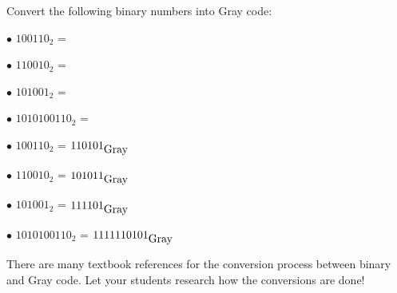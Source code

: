 

Convert the following binary numbers into Gray code:

\medskip
\item{$\bullet$} $100110_2$ = 
\item{$\bullet$} $110010_2$ = 
\item{$\bullet$} $101001_2$ = 
\item{$\bullet$} $1010100110_2$ = 
\medskip







\medskip
\item{$\bullet$} $100110_2$ = $110101_{\hbox{Gray}}$
\vskip 5pt
\item{$\bullet$} $110010_2$ = $101011_{\hbox{Gray}}$
\vskip 5pt
\item{$\bullet$} $101001_2$ = $111101_{\hbox{Gray}}$
\vskip 5pt
\item{$\bullet$} $1010100110_2$ = $1111110101_{\hbox{Gray}}$
\medskip







There are many textbook references for the conversion process between binary and Gray code.  Let your students research how the conversions are done!



